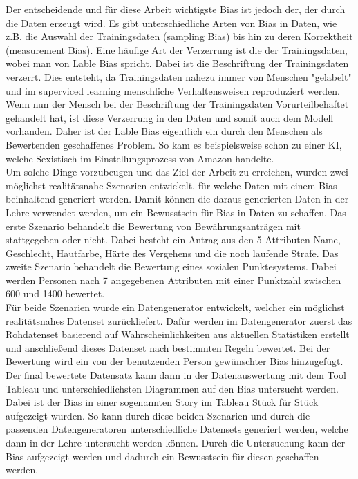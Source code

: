 \begin{onehalfspace}
Der entscheidende und für diese Arbeit wichtigste Bias ist jedoch der, der durch die Daten erzeugt wird. Es gibt unterschiedliche Arten von Bias in Daten, wie z.B. die Auswahl der Trainingsdaten (sampling Bias) bis hin zu deren Korrektheit (measurement Bias). Eine häufige Art der Verzerrung ist die der Trainingsdaten, wobei man von Lable Bias spricht. Dabei ist die Beschriftung der Trainingsdaten verzerrt. Dies entsteht, da Trainingsdaten nahezu immer von Menschen "gelabelt" und im superviced learning menschliche Verhaltensweisen reproduziert werden. Wenn nun der Mensch bei der Beschriftung der Trainingsdaten Vorurteilbehaftet gehandelt hat, ist diese Verzerrung in den Daten und somit auch dem Modell vorhanden. Daher ist der Lable Bias eigentlich ein durch den Menschen als Bewertenden geschaffenes Problem. So kam es beispielsweise schon zu einer KI, welche Sexistisch im Einstellungsprozess von Amazon handelte.\\
Um solche Dinge vorzubeugen und das Ziel der Arbeit zu erreichen, wurden zwei möglichst realitätsnahe Szenarien entwickelt, für welche Daten mit einem Bias beinhaltend generiert werden. Damit können die daraus generierten Daten in der Lehre verwendet werden, um ein Bewusstsein für Bias in Daten zu schaffen. Das erste Szenario behandelt die Bewertung von Bewährungsanträgen mit stattgegeben oder nicht. Dabei besteht ein Antrag aus den 5 Attributen Name, Geschlecht, Hautfarbe, Härte des Vergehens und die noch laufende Strafe. Das zweite Szenario behandelt die Bewertung eines sozialen Punktesystems. Dabei werden Personen nach 7 angegebenen Attributen mit einer Punktzahl zwischen 600 und 1400 bewertet.\\
Für beide Szenarien wurde ein Datengenerator entwickelt, welcher ein möglichst realitätsnahes Datenset zurückliefert. Dafür werden im Datengenerator zuerst das Rohdatenset basierend auf Wahrscheinlichkeiten aus aktuellen Statistiken erstellt und anschließend dieses Datenset nach bestimmten Regeln bewertet. Bei der Bewertung wird ein von der benutzenden Person gewünschter Bias hinzugefügt. Der final bewertete Datensatz kann dann in der Datenauswertung mit dem Tool Tableau und unterschiedlichsten Diagrammen auf den Bias untersucht werden. Dabei ist der Bias in einer sogenannten Story im Tableau Stück für Stück aufgezeigt wurden. So kann durch diese beiden Szenarien und durch die passenden Datengeneratoren unterschiedliche Datensets generiert werden, welche dann in der Lehre untersucht werden können. Durch die Untersuchung kann der Bias aufgezeigt werden und dadurch ein Bewusstsein für diesen geschaffen werden.\\\\

\end{onehalfspace}
